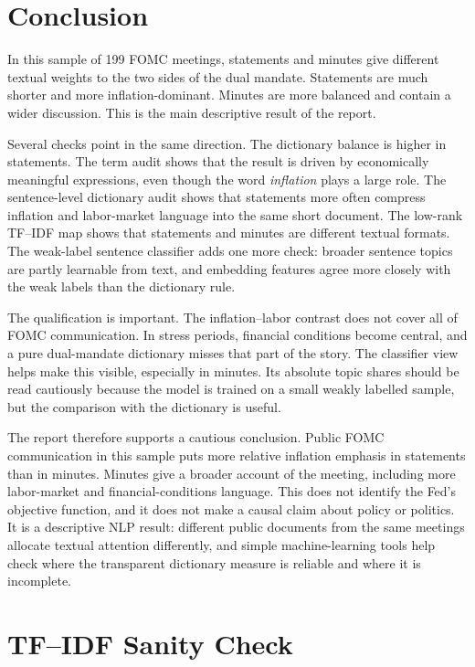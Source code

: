 \documentclass{article}
\newcommand{\fomc}{FOMC}
\newcommand{\tfidf}{TF--IDF}
\begin{document}
\section{Conclusion}
\label{sec:conclusion}

In this sample of 199 \fomc{} meetings, statements and minutes give different textual
weights to the two sides of the dual mandate. Statements are much shorter and more
inflation-dominant. Minutes are more balanced and contain a wider discussion. This is the
main descriptive result of the report.

Several checks point in the same direction. The dictionary balance is higher in
statements. The term audit shows that the result is driven by economically meaningful
expressions, even though the word \emph{inflation} plays a large role. The
sentence-level dictionary audit shows that statements more often compress inflation and
labor-market language into the same short document. The low-rank \tfidf{} map shows that
statements and minutes are different textual formats. The weak-label sentence classifier
adds one more check: broader sentence topics are partly learnable from text, and
embedding features agree more closely with the weak labels than the dictionary rule.

The qualification is important. The inflation--labor contrast does not cover all of
FOMC communication. In stress periods, financial conditions become central, and a pure
dual-mandate dictionary misses that part of the story. The classifier view helps make
this visible, especially in minutes. Its absolute topic shares should be read cautiously
because the model is trained on a small weakly labelled sample, but the comparison with
the dictionary is useful.

The report therefore supports a cautious conclusion. Public FOMC communication in this
sample puts more relative inflation emphasis in statements than in minutes. Minutes give
a broader account of the meeting, including more labor-market and financial-conditions
language. This does not identify the Fed's objective function, and it does not make a
causal claim about policy or politics. It is a descriptive NLP result: different public
documents from the same meetings allocate textual attention differently, and simple
machine-learning tools help check where the transparent dictionary measure is reliable
and where it is incomplete.

\appendix

\section{\tfidf{} Sanity Check}
\label{app:tfidf}
\end{document}
